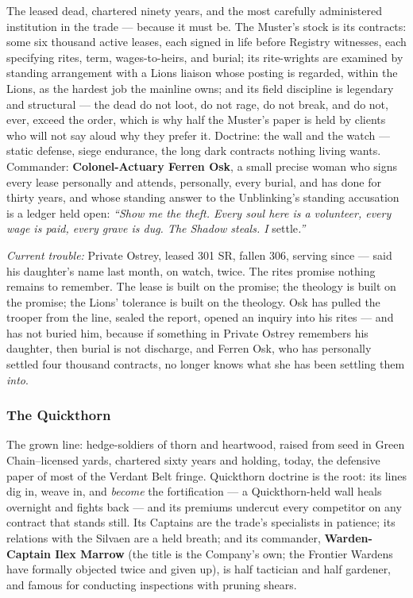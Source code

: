 The leased dead, chartered ninety years, and the most carefully administered institution in the trade --- because it must be. The Muster's stock is its contracts: some six thousand active leases, each signed in life before Registry witnesses, each specifying rites, term, wages-to-heirs, and burial; its rite-wrights are examined by standing arrangement with a Lions liaison whose posting is regarded, within the Lions, as the hardest job the mainline owns; and its field discipline is legendary and structural --- the dead do not loot, do not rage, do not break, and do not, ever, exceed the order, which is why half the Muster's paper is held by clients who will not say aloud why they prefer it. Doctrine: the wall and the watch --- static defense, siege endurance, the long dark contracts nothing living wants. Commander: \textbf{Colonel-Actuary Ferren Osk}, a small precise woman who signs every lease personally and attends, personally, every burial, and has done for thirty years, and whose standing answer to the Unblinking's standing accusation is a ledger held open: \textit{``Show me the theft. Every soul here is a volunteer, every wage is paid, every grave is dug. The Shadow steals. I} settle\textit{.''}

\textit{Current trouble:} Private Ostrey, leased 301 SR, fallen 306, serving since --- said his daughter's name last month, on watch, twice. The rites promise nothing remains to remember. The lease is built on the promise; the theology is built on the promise; the Lions' tolerance is built on the theology. Osk has pulled the trooper from the line, sealed the report, opened an inquiry into his rites --- and has not buried him, because if something in Private Ostrey remembers his daughter, then burial is not discharge, and Ferren Osk, who has personally settled four thousand contracts, no longer knows what she has been settling them \textit{into}.

\subsubsection{The Quickthorn}

The grown line: hedge-soldiers of thorn and heartwood, raised from seed in Green Chain--licensed yards, chartered sixty years and holding, today, the defensive paper of most of the Verdant Belt fringe. Quickthorn doctrine is the root: its lines dig in, weave in, and \textit{become} the fortification --- a Quickthorn-held wall heals overnight and fights back --- and its premiums undercut every competitor on any contract that stands still. Its Captains are the trade's specialists in patience; its relations with the Silvaen are a held breath; and its commander, \textbf{Warden-Captain Ilex Marrow} (the title is the Company's own; the Frontier Wardens have formally objected twice and given up), is half tactician and half gardener, and famous for conducting inspections with pruning shears.

